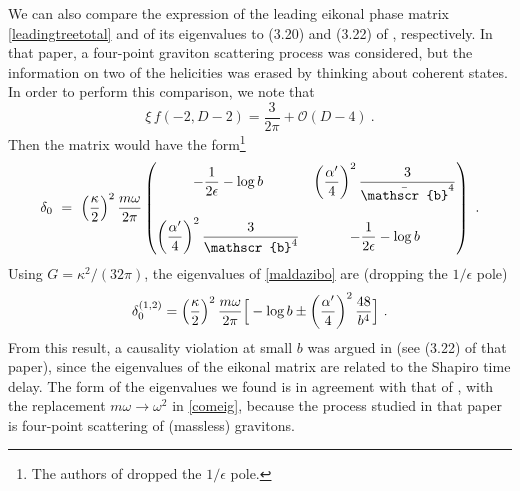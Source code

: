 \documentclass[a4paper,11pt]{article}
\numberwithin{equation}{section}
\newcommand{\cO}{\mathcal{O}}
\begin{document}
We can also compare the expression of  the leading eikonal phase matrix \eqref{leadingtreetotal} and of its eigenvalues to (3.20) and (3.22)  of \cite{Camanho:2014apa}, respectively. 
In that paper,  a four-point graviton scattering process was considered, but the information on two of the helicities was erased by thinking about coherent states. In order to perform  this comparison, we note that 
\begin{equation}
\xi \, f(-2, D-2) = \frac{3}{2\pi} + \cO(D-4)\ .
\end{equation}
Then the matrix would have the form\footnote{The  authors of \cite{Camanho:2014apa} dropped the $1/ \epsilon$ pole.} 
\begin{align}
\mathcal{\delta}_0 \ =  \  \left({\kappa\over 2}\right)^2 {m \omega\over 2 \pi }  
\begin{pmatrix} 
\label{maldazibo}
- \dfrac{1}{2 \epsilon} - \log b  & \left(\dfrac{\alpha^\prime}{4}\right)^2  \dfrac{3}{\bar{\mathscr{b}}^4}\\ \cr \left(\dfrac{\alpha^\prime}{4}\right)^2  \dfrac{3}{{\mathscr{b}}^4} & - \dfrac{1}{2 \epsilon} - \log b  
\end{pmatrix}\ . 
\end{align}
Using $G = \kappa^2/ (32 \pi)$, 
the  eigenvalues  of \eqref{maldazibo} are (dropping the $1/ \epsilon$ pole)
\begin{align}
\label{comeig}
\mathcal{\delta}_0^{(1,2)} = 
\left({\kappa\over 2}\right)^2 {m \omega\over 2 \pi }  
\Big[  - \log b  \pm \left({\alpha^\prime\over 4}\right)^2  {48 \over b^4}\Big]\ .
\end{align}
From this result,  a causality violation at small $b$ was argued in \cite{Camanho:2014apa} (see (3.22) of that paper), since the eigenvalues of the eikonal matrix are related to the Shapiro time delay. The form of the eigenvalues we found is in agreement with that  of \cite{Camanho:2014apa}, with the replacement $m\omega \to \omega^2$  in \eqref{comeig}, because the process studied in that paper is four-point scattering of (massless) gravitons.
\end{document}
